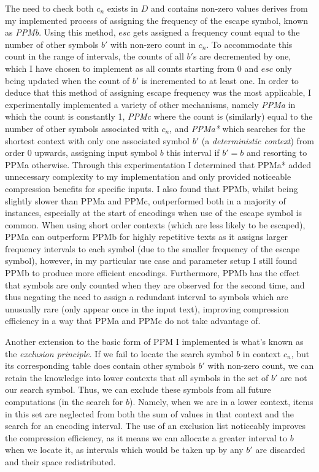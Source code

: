 \documentclass[a4paper, 11pt]{article}
\begin{document}
The need to check both $c_{n}$ exists in $D$ and contains non-zero values derives from my implemented process of assigning the frequency of the escape symbol, known as \emph{PPMb}. Using this method, $esc$ gets assigned a frequency count equal to the number of other symbols $b'$ with non-zero count in $c_{n}$. To accommodate this count in the range of intervals, the counts of all $b'$s are decremented by one, which I have chosen to implement as all counts starting from 0 and $esc$ only being updated when the count of $b'$ is incremented to at least one. In order to deduce that this method of assigning escape frequency was the most applicable, I experimentally implemented a variety of other mechanisms, namely \emph{PPMa} in which the count is constantly 1, \emph{PPMc} where the count is (similarly) equal to the number of other symbols associated with $c_{n}$, and \emph{PPMa*} which searches for the shortest context with only one associated symbol $b'$ (a \emph{deterministic context}) from order 0 upwards, assigning input symbol $b$ this interval if $b' = b$ and resorting to PPMa otherwise. Through this experimentation I determined that PPMa* added unnecessary complexity to my implementation and only provided noticeable compression benefits for specific inputs. I also found that PPMb, whilst being slightly slower than PPMa and PPMc, outperformed both in a majority of instances, especially at the start of encodings when use of the escape symbol is common. When using short order contexts (which are less likely to be escaped), PPMa can outperform PPMb for highly repetitive texts as it assigns larger frequency intervals to each symbol (due to the smaller frequency of the escape symbol), however, in my particular use case and parameter setup I still found PPMb to produce more efficient encodings. Furthermore, PPMb has the effect that symbols are only counted when they are observed for the second time, and thus negating the need to assign a redundant interval to symbols which are unusually rare (only appear once in the input text), improving compression efficiency in a way that PPMa and PPMc do not take advantage of. 

Another extension to the basic form of PPM I implemented is what's known as the \emph{exclusion principle}. If we fail to locate the search symbol $b$ in context $c_{n}$, but its corresponding table does contain other symbols $b'$ with non-zero count, we can retain the knowledge into lower contexts that all symbols in the set of $b'$ are not our search symbol. Thus, we can exclude these symbols from all future computations (in the search for $b$). Namely, when we are in a lower context, items in this set are neglected from both the sum of values in that context and the search for an encoding interval. The use of an exclusion list noticeably improves the compression efficiency, as it means we can allocate a greater interval to $b$ when we locate it, as intervals which would be taken up by any $b'$ are discarded and their space redistributed.
\end{document}
